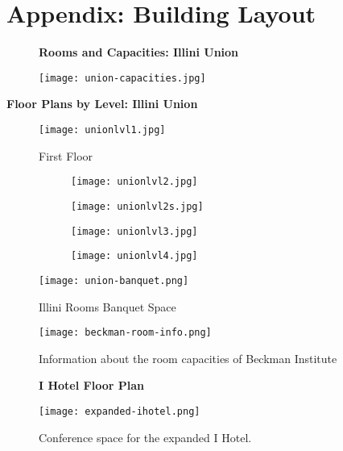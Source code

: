 \section{Appendix: Building Layout}
\label{appendix:building}
\begin{figure}[H]
	\centering
	\textbf{Rooms and Capacities: Illini Union} \par\medskip
	\texttt{[image: union-capacities.jpg]}
\end{figure}

\newpage
{\centering\textbf{Floor Plans by Level: Illini Union} \par\medskip}
\begin{figure}[H]
	\centering
	\texttt{[image: unionlvl1.jpg]}
	\caption{First Floor}
\end{figure}

\begin{figure}[H]
	\centering
	\begin{subfigure}{0.5\textwidth}
		\centering
		\texttt{[image: unionlvl2.jpg]}
	\end{subfigure}%
	\begin{subfigure}{0.5\textwidth}
		\centering
		\texttt{[image: unionlvl2s.jpg]}
	\end{subfigure}
	\begin{subfigure}{0.5\textwidth}
		\centering
		\texttt{[image: unionlvl3.jpg]}
	\end{subfigure}%
	\begin{subfigure}{0.5\textwidth}
		\centering
		\texttt{[image: unionlvl4.jpg]}
	\end{subfigure}		
\end{figure}

\begin{figure}
	\centering
	\texttt{[image: union-banquet.png]}
	\caption{Illini Rooms Banquet Space}
\end{figure}

\begin{figure}
	\centering
	\texttt{[image: beckman-room-info.png]}
	\caption{Information about the room capacities of Beckman Institute}
\end{figure}

\vspace{1cm}
\begin{figure}[H]
	\centering
	\textbf{I Hotel Floor Plan} \par\medskip
	\texttt{[image: expanded-ihotel.png]}
	\caption{Conference space for the expanded I Hotel.}
\end{figure}

